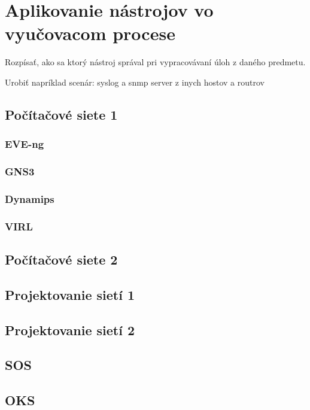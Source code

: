 \chapter{Aplikovanie nástrojov vo vyučovacom procese}

Rozpísať, ako sa ktorý nástroj správal pri vypracovávaní úloh z daného predmetu.

Urobiť napríklad scenár: syslog a snmp server z inych hostov a routrov

\section{Počítačové siete 1}
\subsection{EVE-ng}
\subsection{GNS3}
\subsection{Dynamips}
\subsection{VIRL}

\clearpage

\section{Počítačové siete 2}

\clearpage

\section{Projektovanie sietí 1}

\clearpage

\section{Projektovanie sietí 2}

\clearpage

\section{SOS}

\clearpage

\section{OKS}